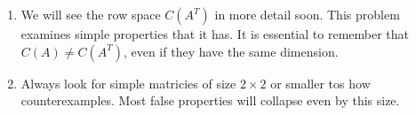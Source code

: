 \documentclass[11pt]{article}
\begin{document}
\begin{itemize}
\begin{examplebox}[1.3]
\begin{solution}[1.3]
	\end{solution}
	\begin{takeaways}[1.3]\quad\vspace{-0.3cm}
		\begin{enumerate}
		    \item We will see the row space $C(A^{T})$ in more detail soon. This problem examines simple properties that it has. It is essential to remember that $C(A) \neq C(A^{T})$, even if they have the same dimension.
			\item Always look for simple matricies of size $2 \times 2$ or smaller tos how counterexamples. Most false properties will collapse even by this size.
		\end{enumerate}
	\end{takeaways}
    
\end{examplebox}


\end{itemize}
\end{document}
